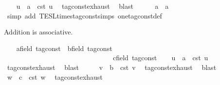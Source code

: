 \begin{isabellebody}
\ \ \isamarkupfalse%
\ u\ \ {\isacartoucheopen}a\ {\isacharequal}\ {\isasymtau}\isactrlsub c\isactrlsub s\isactrlsub t\ u{\isacartoucheclose}\ \isamarkupfalse%
\ tag{\isacharunderscore}const{\isachardot}exhaust\ \isamarkupfalse%
\ blast\isanewline
\ \ \isamarkupfalse%
\ {\isacartoucheopen}{}\ {\isacharasterisk}\ a\ {\isacharequal}\ a{\isacartoucheclose}\isanewline
\ \ \ \ \isamarkupfalse%
\ {\isacharparenleft}simp\ add{\isacharcolon}\ TESL{\isachardot}times{\isacharunderscore}tag{\isacharunderscore}const{\isachardot}simps\ one{\isacharunderscore}tag{\isacharunderscore}const{\isacharunderscore}def{\isacharparenright}\isanewline
{}\isamarkupfalse%
%
\begin{isamarkuptext}%
Addition is associative.%
\end{isamarkuptext}\isamarkuptrue%
\ \ \isamarkupfalse%
\ a{\isacharcolon}{\isacharcolon}{\isacartoucheopen}{\isacharprime}{\isasymtau}{\isacharcolon}{\isacharcolon}field\ tag{\isacharunderscore}const{\isacartoucheclose}\ \ b{\isacharcolon}{\isacharcolon}{\isacartoucheopen}{\isacharprime}{\isasymtau}{\isacharcolon}{\isacharcolon}field\ tag{\isacharunderscore}const{\isacartoucheclose}\isanewline
\ \ \ \ \ \ \ \ \ \ \ \ \ \ \ \ \ \ \ \ \ \ \ \ \ \ \ \ \ \ \ \ c{\isacharcolon}{\isacharcolon}{\isacartoucheopen}{\isacharprime}{\isasymtau}{\isacharcolon}{\isacharcolon}field\ tag{\isacharunderscore}const{\isacartoucheclose}\isanewline
\ \ \isamarkupfalse%
\ u\ \ {\isacartoucheopen}a\ {\isacharequal}\ {\isasymtau}\isactrlsub c\isactrlsub s\isactrlsub t\ u{\isacartoucheclose}\ \isamarkupfalse%
\ tag{\isacharunderscore}const{\isachardot}exhaust\ \isamarkupfalse%
\ blast\isanewline
\ \ \isamarkupfalse%
\ \isamarkupfalse%
\ v\ \ {\isacartoucheopen}b\ {\isacharequal}\ {\isasymtau}\isactrlsub c\isactrlsub s\isactrlsub t\ v{\isacartoucheclose}\ \isamarkupfalse%
\ tag{\isacharunderscore}const{\isachardot}exhaust\ \isamarkupfalse%
\ blast\isanewline
\ \ \isamarkupfalse%
\ \isamarkupfalse%
\ w\ \ {\isacartoucheopen}c\ {\isacharequal}\ {\isasymtau}\isactrlsub c\isactrlsub s\isactrlsub t\ w{\isacartoucheclose}\ \isamarkupfalse%
\ tag{\isacharunderscore}const{\isachardot}exhaust\ \isamarkupfalse%

\end{isabellebody}
